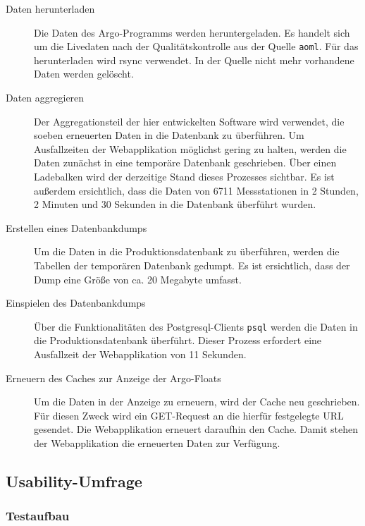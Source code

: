 \begin{description}
 \item [Daten herunterladen]
    Die Daten des Argo-Programms werden heruntergeladen. Es handelt sich um die Livedaten nach der Qualitätskontrolle aus der Quelle \texttt{aoml}. Für das herunterladen wird rsync verwendet. In der Quelle nicht mehr vorhandene Daten werden gelöscht.


 \item [Daten aggregieren]
    Der Aggregationsteil der hier entwickelten Software wird verwendet, die soeben erneuerten Daten in die Datenbank zu überführen. Um Ausfallzeiten der Webapplikation möglichst gering zu halten, werden die Daten zunächst in eine temporäre Datenbank geschrieben. Über einen Ladebalken wird der derzeitige Stand dieses Prozesses sichtbar. Es ist außerdem ersichtlich, dass die Daten von 6711 Messstationen in 2 Stunden, 2 Minuten und 30 Sekunden in die Datenbank überführt wurden.

 \item [Erstellen eines Datenbankdumps]
    Um die Daten in die Produktionsdatenbank zu überführen, werden die Tabellen der temporären Datenbank gedumpt. Es ist ersichtlich, dass der Dump eine Größe von  ca. 20 Megabyte umfasst.

 \item [Einspielen des Datenbankdumps]
    Über die Funktionalitäten des Postgresql-Clients \newline\texttt{psql} werden die Daten in die Produktionsdatenbank überführt. Dieser Prozess erfordert eine Ausfallzeit der Webapplikation von 11 Sekunden.

 \item [Erneuern des Caches zur Anzeige der Argo-Floats]
    Um die Daten in der Anzeige zu erneuern, wird der Cache neu geschrieben. Für diesen Zweck wird ein GET-Request an die hierfür festgelegte URL gesendet. Die Webapplikation erneuert daraufhin den Cache. Damit stehen der Webapplikation die erneuerten  Daten zur Verfügung.
\end{description}



\newpage
\subsection{Usability-Umfrage}

\subsubsection{Testaufbau}

